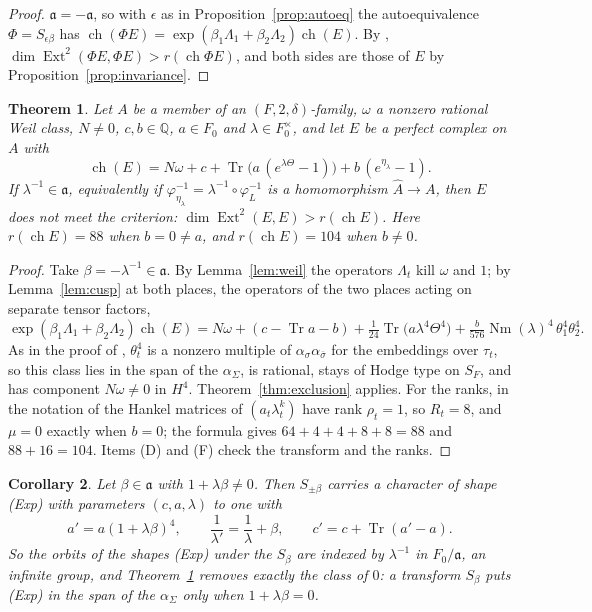 \documentclass[11pt]{amsart}
\newtheorem{theorem}{Theorem}[section]
\newtheorem{corollary}[theorem]{Corollary}
\theoremstyle{definition}
\theoremstyle{remark}
\newcommand{\QQ}{\mathbb{Q}}
\newcommand{\fa}{\mathfrak{a}}
\newcommand{\Av}{\widehat{A}}
\newcommand{\ch}{\operatorname{ch}}
\newcommand{\Ext}{\operatorname{Ext}}
\newcommand{\Tr}{\operatorname{Tr}}
\newcommand{\Nm}{\operatorname{Nm}}
\newcommand{\bbar}{\overline}
\begin{document}
\begin{proof}
$\fa=-\fa$, so with $\epsilon$ as in Proposition~\ref{prop:autoeq} the
autoequivalence $\Phi=S_{\epsilon\beta}$ has $\ch(\Phi E)=
\exp(\beta_{1}\Lambda_{1}+\beta_{2}\Lambda_{2})\ch(E)$. By
\cite[Theorem~19.12]{BMB}, $\dim\Ext^{2}(\Phi E,\Phi E)>r(\ch\Phi E)$, and
both sides are those of $E$ by Proposition~\ref{prop:invariance}.
\end{proof}

\begin{theorem}\label{thm:main}
Let $A$ be a member of an $(F,2,\delta)$-family, $\omega$ a nonzero rational
Weil class, $N\neq0$, $c,b\in\QQ$, $a\in F_{0}$ and $\lambda\in F_{0}^{\times}$,
and let $E$ be a perfect complex on $A$ with
\[
  \ch(E)=N\omega+c+\Tr\bigl(a\,(e^{\lambda\Theta}-1)\bigr)
  +b\,(e^{\eta_{\lambda}}-1).
\]
If $\lambda^{-1}\in\fa$, equivalently if $\varphi_{\eta_{\lambda}}^{-1}
=\lambda^{-1}\circ\varphi_{L}^{-1}$ is a homomorphism $\Av\to A$, then $E$
does not meet the criterion: $\dim\Ext^{2}(E,E)>r(\ch E)$. Here
$r(\ch E)=88$ when $b=0\neq a$, and $r(\ch E)=104$ when $b\neq0$.
\end{theorem}

\begin{proof}
Take $\beta=-\lambda^{-1}\in\fa$. By Lemma~\ref{lem:weil} the operators
$\Lambda_{t}$ kill $\omega$ and $1$; by Lemma~\ref{lem:cusp} at both places,
the operators of the two places acting on separate tensor factors,
\[
  \exp(\beta_{1}\Lambda_{1}+\beta_{2}\Lambda_{2})\ch(E)
  =N\omega+(c-\Tr a-b)+\tfrac{1}{24}\Tr\bigl(a\lambda^{4}\Theta^{4}\bigr)
  +\tfrac{b}{576}\Nm(\lambda)^{4}\,\theta_{1}^{4}\theta_{2}^{4}.
\]
As in the proof of \cite[Proposition~19.24]{BMB}, $\theta_{t}^{4}$ is a
nonzero multiple of $\alpha_{\sigma}\alpha_{\bbar\sigma}$ for the embeddings
over $\tau_{t}$, so this class lies in the span of the $\alpha_{\Sigma}$, is
rational, stays of Hodge type on $S_{F}$, and has component $N\omega\neq0$ in
$H^{4}$. Theorem~\ref{thm:exclusion} applies. For the ranks, in the notation
of \cite[Theorem~19.22]{BMB} the Hankel matrices of $(a_{t}\lambda_{t}^{k})$
have rank $\rho_{t}=1$, so $R_{t}=8$, and $\mu=0$ exactly when $b=0$; the
formula gives $64+4+4+8+8=88$ and $88+16=104$. Items (D) and (F) check the
transform and the ranks.
\end{proof}

\begin{corollary}\label{cor:cusps}
Let $\beta\in\fa$ with $1+\lambda\beta\neq0$. Then $S_{\pm\beta}$ carries a
character of shape \textup{(Exp)} with parameters $(c,a,\lambda)$ to one with
\[
  a'=a(1+\lambda\beta)^{4},\qquad \frac{1}{\lambda'}=\frac{1}{\lambda}+\beta,
  \qquad c'=c+\Tr(a'-a).
\]
So the orbits of the shapes \textup{(Exp)} under the $S_{\beta}$ are indexed
by $\lambda^{-1}$ in $F_{0}/\fa$, an infinite group, and
Theorem~\ref{thm:main} removes exactly the class of $0$: a transform
$S_{\beta}$ puts \textup{(Exp)} in the span of the $\alpha_{\Sigma}$ only when
$1+\lambda\beta=0$.
\end{corollary}
\end{document}
